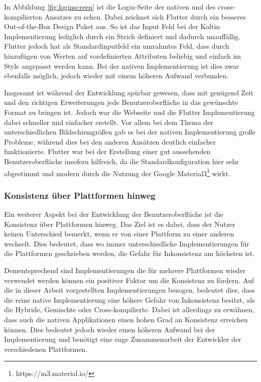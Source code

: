 In Abbildung \ref{fig:loginscreen} ist die Login-Seite der nativen und des cross-kompilierten Ansatzes zu sehen. Dabei zeichnet sich Flutter durch ein besseres Out-of-the-Box Design Paket aus. So ist das Input Feld bei der Koltin Implementierung  lediglich durch ein Strich definiert und dadurch unauffällig. Flutter jedoch hat als Standardinputfeld ein umrahmtes Feld, dass durch hinzufügen von Werten auf vordefinierten Attributen beliebig und einfach im Style angepasst werden kann. Bei der nativen Implementierung ist dies zwar ebenfalls möglich, jedoch wieder mit einem höheren Aufwand verbunden.

Insgesamt ist während der Entwicklung spürbar gewesen, dass mit genügend Zeit und den richtigen Erweiterungen jede Benutzeroberfläche in das gewünschte Format zu bringen ist. Jedoch war die Webseite und die Flutter Implementierung dabei schneller und einfacher erstellt. Vor allem bei dem Thema der unterschiedlichen Bildschirmgrößen gab es bei der nativen Implementierung große Probleme, während dies bei den anderen Ansätzen deutlich einfacher funktionierte. Flutter war bei der Erstellung einer gut aussehenden Benutzeroberfläche insofern hilfreich, da die Standardkonfiguration hier sehr abgestimmt und modern durch die Nutzung der Google Material3\footnote{https://m3.material.io/} wirkt.

\subsubsection{Konsistenz über Plattformen hinweg}
Ein weiterer Aspekt bei der Entwicklung der Benutzeroberfläche ist die Konsistenz über Plattformen hinweg. Das Ziel ist es dabei, dass der Nutzer keinen Unterschied bemerkt, wenn er von einer Plattform zu einer anderen wechselt. 
Dies bedeutet, dass wo immer unterschiedliche Implementierungen für die Plattformen geschrieben werden, die Gefahr für Inkonsistenz am höchsten ist.

Dementsprechend sind Implementierungen die für mehrere Plattformen wieder verwendet werden können ein positiver Faktor um die Konsistenz zu fördern.
Auf die in dieser Arbeit vorgestellten Implementierungen bezogen, bedeutet dies, dass die reine native Implementierung eine höhere Gefahr von Inkonsistenz besitzt, als die Hybride, Gemischte oder Cross-kompilierte.
Dabei ist allerdings zu erwähnen, dass auch die nativen Applikationen einen hohen Grad an Konsistenz erreichen können. Dies bedeutet jedoch wieder einen höheren Aufwand bei der Implementierung und benötigt eine enge Zusammenarbeit der Entwickler der verschiedenen Plattformen.


